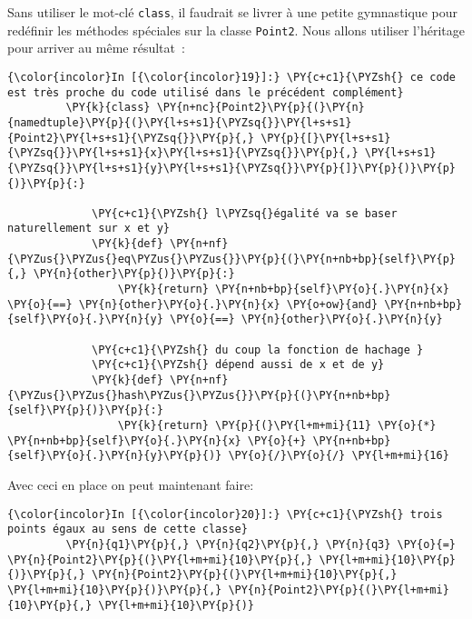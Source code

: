     Sans utiliser le mot-clé \texttt{class}, il faudrait se livrer à une
petite gymnastique pour redéfinir les méthodes spéciales sur la classe
\texttt{Point2}. Nous allons utiliser l'héritage pour arriver au même
résultat~:

    \begin{Verbatim}[commandchars=\\\{\},frame=single,framerule=0.3mm,rulecolor=\color{cellframecolor}]
{\color{incolor}In [{\color{incolor}19}]:} \PY{c+c1}{\PYZsh{} ce code est très proche du code utilisé dans le précédent complément}
         \PY{k}{class} \PY{n+nc}{Point2}\PY{p}{(}\PY{n}{namedtuple}\PY{p}{(}\PY{l+s+s1}{\PYZsq{}}\PY{l+s+s1}{Point2}\PY{l+s+s1}{\PYZsq{}}\PY{p}{,} \PY{p}{[}\PY{l+s+s1}{\PYZsq{}}\PY{l+s+s1}{x}\PY{l+s+s1}{\PYZsq{}}\PY{p}{,} \PY{l+s+s1}{\PYZsq{}}\PY{l+s+s1}{y}\PY{l+s+s1}{\PYZsq{}}\PY{p}{]}\PY{p}{)}\PY{p}{)}\PY{p}{:}
         
             \PY{c+c1}{\PYZsh{} l\PYZsq{}égalité va se baser naturellement sur x et y}
             \PY{k}{def} \PY{n+nf}{\PYZus{}\PYZus{}eq\PYZus{}\PYZus{}}\PY{p}{(}\PY{n+nb+bp}{self}\PY{p}{,} \PY{n}{other}\PY{p}{)}\PY{p}{:}
                 \PY{k}{return} \PY{n+nb+bp}{self}\PY{o}{.}\PY{n}{x} \PY{o}{==} \PY{n}{other}\PY{o}{.}\PY{n}{x} \PY{o+ow}{and} \PY{n+nb+bp}{self}\PY{o}{.}\PY{n}{y} \PY{o}{==} \PY{n}{other}\PY{o}{.}\PY{n}{y}
         
             \PY{c+c1}{\PYZsh{} du coup la fonction de hachage }
             \PY{c+c1}{\PYZsh{} dépend aussi de x et de y}
             \PY{k}{def} \PY{n+nf}{\PYZus{}\PYZus{}hash\PYZus{}\PYZus{}}\PY{p}{(}\PY{n+nb+bp}{self}\PY{p}{)}\PY{p}{:}
                 \PY{k}{return} \PY{p}{(}\PY{l+m+mi}{11} \PY{o}{*} \PY{n+nb+bp}{self}\PY{o}{.}\PY{n}{x} \PY{o}{+} \PY{n+nb+bp}{self}\PY{o}{.}\PY{n}{y}\PY{p}{)} \PY{o}{/}\PY{o}{/} \PY{l+m+mi}{16}
\end{Verbatim}


    Avec ceci en place on peut maintenant faire:

    \begin{Verbatim}[commandchars=\\\{\},frame=single,framerule=0.3mm,rulecolor=\color{cellframecolor}]
{\color{incolor}In [{\color{incolor}20}]:} \PY{c+c1}{\PYZsh{} trois points égaux au sens de cette classe}
         \PY{n}{q1}\PY{p}{,} \PY{n}{q2}\PY{p}{,} \PY{n}{q3} \PY{o}{=} \PY{n}{Point2}\PY{p}{(}\PY{l+m+mi}{10}\PY{p}{,} \PY{l+m+mi}{10}\PY{p}{)}\PY{p}{,} \PY{n}{Point2}\PY{p}{(}\PY{l+m+mi}{10}\PY{p}{,} \PY{l+m+mi}{10}\PY{p}{)}\PY{p}{,} \PY{n}{Point2}\PY{p}{(}\PY{l+m+mi}{10}\PY{p}{,} \PY{l+m+mi}{10}\PY{p}{)}
\end{Verbatim}



